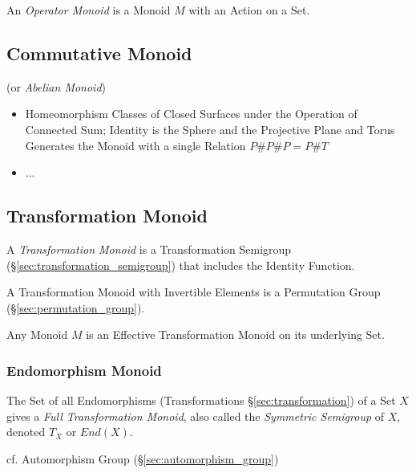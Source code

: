 An \emph{Operator Monoid} is a Monoid $M$ with an Action on a Set.



\subsection{Commutative Monoid}\label{sec:commutative_monoid}

(or \emph{Abelian Monoid})

\begin{itemize}
  \item Homeomorphism Classes of Closed Surfaces under the Operation of
    Connected Sum; Identity is the Sphere and the Projective Plane and Torus
    Generates the Monoid with a single Relation $P \# P \# P = P \# T$
  \item ...
\end{itemize}



\subsection{Transformation Monoid}\label{sec:transformation_monoid}

A \emph{Transformation Monoid} is a Transformation Semigroup
(\S\ref{sec:transformation_semigroup}) that includes the Identity
Function.

A Transformation Monoid with Invertible Elements is a Permutation Group
(\S\ref{sec:permutation_group}).

Any Monoid $M$ is an Effective Transformation Monoid on its underlying
Set.



\subsubsection{Endomorphism Monoid}\label{sec:endomorphism_monoid}

The Set of all Endomorphisms (Transformations \S\ref{sec:transformation}) of a
Set $X$ gives a \emph{Full Transformation Monoid}, also called the
\emph{Symmetric Semigroup} of $X$, denoted $T_X$ or $End(X)$.

cf. Automorphism Group (\S\ref{sec:automorphism_group})

